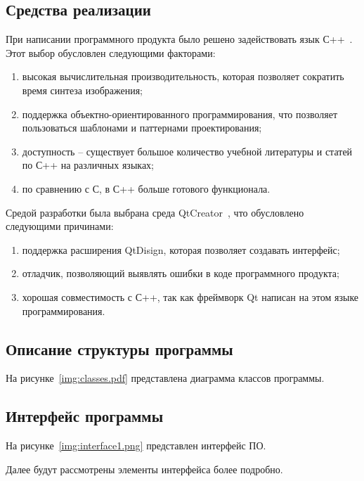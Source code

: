 \newpage
\subsection{Средства реализации}
При написании программного продукта было решено задействовать язык С++~\cite{cpp}. Этот выбор обусловлен следующими факторами:
\begin{enumerate}
	\item высокая вычислительная производительность, которая позволяет сократить время синтеза изображения;
	\item поддержка объектно-ориентированного программирования, что позволяет пользоваться шаблонами и паттернами проектирования;
	\item доступность – существует большое количество учебной литературы и статей по С++ на различных языках;
	\item по сравнению с С, в С++ больше готового функционала.
\end{enumerate}
Средой разработки была выбрана среда QtCreator~\cite{qt}, что обусловлено следующими причинами:
\begin{enumerate}
	\item поддержка расширения QtDisign, которая позволяет создавать интерфейс;
	\item отладчик, позволяющий выявлять ошибки в коде программного продукта;
	\item хорошая совместимость с С++, так как фреймворк Qt написан на этом языке программирования.
\end{enumerate}
\newpage

\subsection{Описание структуры программы}
На рисунке~\ref{img:classes.pdf} представлена диаграмма классов программы.

\newpage
\subsection{Интерфейс программы}
На рисунке~\ref{img:interface1.png} представлен интерфейс ПО. 

Далее будут рассмотрены элементы интерфейса более подробно.

